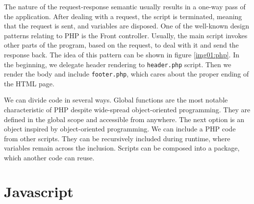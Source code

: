 \par
The nature of the request-response semantic usually results in a one-way pass of the application.
After dealing with a request, the script is terminated, meaning that the request is sent, and variables are disposed.
One of the well-known design patterns relating to PHP is the Front controller.
Usually, the main script invokes other parts of the program, based on the request, to deal with it and send the response back.
The idea of this pattern can be shown in figure \ref{img01:php}.
In the beginning, we delegate header rendering to \texttt{header.php} script.
Then we render the body and include \texttt{footer.php}, which cares about the proper ending of the HTML page.
\par
We can divide code in several ways.
Global functions are the most notable characteristic of PHP despite wide-spread object-oriented programming.
They are defined in the global scope and accessible from anywhere.
The next option is an object inspired by object-oriented programming.
We can include a PHP code from other scripts.
They can be recursively included during runtime, where variables remain across the inclusion.
Scripts can be composed into a package, which another code can reuse.

\section{Javascript}


